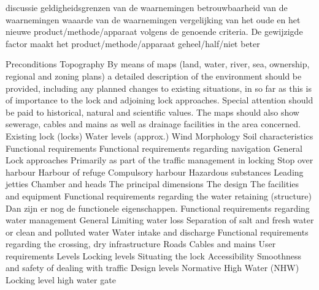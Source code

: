 
discussie
geldigheidsgrenzen van de waarnemingen
betrouwbaarheid van de waarnemingen
waaarde van de waarnemingen
vergelijking van het oude en het nieuwe product/methode/apparaat volgens de genoende criteria. De gewijzigde factor maakt het product/methode/apparaat geheel/half/niet beter





Preconditions
Topography
By means of maps (land, water, river, sea, ownership, regional and zoning plans) a detailed description
of the environment should be provided, including any planned changes to existing situations, in so far
as this is of importance to the lock and adjoining lock approaches. Special attention should be paid to
historical, natural and scientific values. The maps should also show sewerage, cables and mains as well
as drainage facilities in the area concerned.
Existing lock (locks)
Water levels (approx.)
Wind
Morphology
Soil characteristics
Functional requirements
Functional requirements regarding navigation
General
Lock approaches
Primarily as part of the traffic management in locking
Stop over harbour
Harbour of refuge
Compulsory harbour
Hazardous substances
Leading jetties
Chamber and heads
The principal dimensions
The design
The facilities and equipment
Functional requirements regarding the water retaining (structure)
\newline \indent Dan zijn er nog de functionele eigenschappen.
Functional requirements regarding water management
General
Limiting water loss
Separation of salt and fresh water or clean and polluted water
Water intake and discharge
\newline \indent Functional requirements regarding the crossing, dry infrastructure
Roads
Cables and mains
\newline \indent  User requirements
\newline \indent Levels
Locking levels
Situating the lock
Accessibility
Smoothness and safety of dealing with traffic
Design levels
Normative High Water (NHW)
Locking level high water gate
